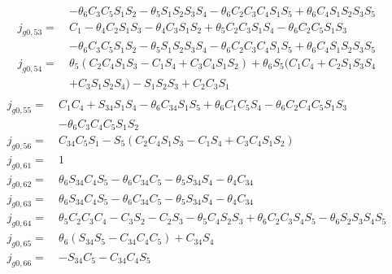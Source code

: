 \begin{equation*}
\begin{split}
		 	  & - \theta _6C_3C_5S_1S_2 - \theta _5S_1S_2S_3S_4 - \theta _6C_2C_3C_4S_1S_5 + \theta _6C_4S_1S_2S_3S_5\\
j_{g0,53} =\  &C_1 - \theta _4C_2S_1S_3 - \theta _4C_3S_1S_2 + \theta _5C_2C_3S_1S_4 - \theta _6C_2C_5S_1S_3\\
		 	  & - \theta _6C_3C_5S_1S_2 - \theta _5S_1S_2S_3S_4- \theta _6C_2C_3C_4S_1S_5 + \theta _6C_4S_1S_2S_3S_5\\
j_{g0,54} =\  &\theta _5(C_2C_4S_1S_3 - C_1S_4 + C_3C_4S_1S_2) + \theta _6S_5(C_1C_4 + C_2S_1S_3S_4\\
		 	  & + C_3S_1S_2S_4)- S_1S_2S_3 + C_2C_3S_1\\
\end{split}
\end{equation*}
\begin{equation*}
\begin{split}
j_{g0,55} =\  &C_1C_4 + S_{34}S_1S_4 - \theta _6C_{34}S_1S_5 + \theta _6C_1C_5S_4 - \theta _6C_2C_4C_5S_1S_3\\
		 	  & - \theta _6C_3C_4C_5S_1S_2\\
j_{g0,56} =\  &C_{34}C_5S_1 - S_5(C_2C_4S_1S_3 - C_1S_4 + C_3C_4S_1S_2)\\
j_{g0,61} =\  &1\\
j_{g0,62} =\  &\theta _6S_{34}C_4S_5 - \theta _6C_{34}C_5 - \theta _5S_{34}S_4 - \theta _4C_{34}\\
j_{g0,63} =\  &\theta _6S_{34}C_4S_5 - \theta _6C_{34}C_5 - \theta _5S_{34}S_4 - \theta _4C_{34}\\
j_{g0,64} =\  &\theta _5C_2C_3C_4 - C_3S_2 - C_2S_3 - \theta _5C_4S_2S_3 + \theta _6C_2C_3S_4S_5 - \theta _6S_2S_3S_4S_5\\
j_{g0,65} =\  &\theta _6(S_{34}S_5 - C_{34}C_4C_5) + C_{34}S_4\\
j_{g0,66} =\  &- S_{34}C_5 - C_{34}C_4S_5\\
\end{split}
\end{equation*}

